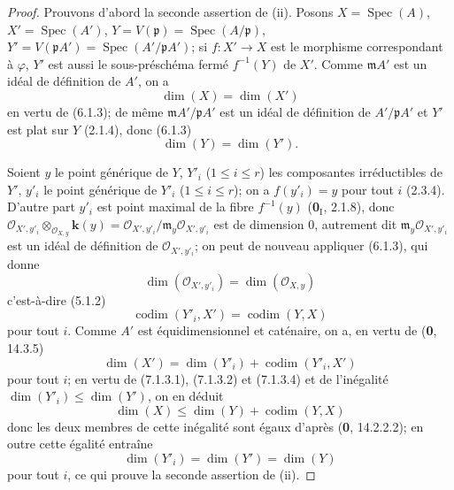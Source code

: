 \begin{proof}
Prouvons d'abord la seconde assertion de (ii). Posons
$X=\operatorname{Spec}(A)$, $X'=\operatorname{Spec}(A')$,
$Y=V(\mathfrak p)=\operatorname{Spec}(A/\mathfrak p)$,
$Y'=V(\mathfrak pA')=\operatorname{Spec}(A'/\mathfrak pA')$; si
$f:X'\to X$ est le morphisme correspondant à $\varphi$, $Y'$ est aussi le
sous-préschéma fermé $f^{-1}(Y)$ de $X'$. Comme $\mathfrak mA'$ est un idéal
de définition de $A'$, on a
\begin{equation}
\dim(X)=\dim(X')
\tag{7.1.3.1}
\label{IV.2.eq.7.1.3.1-fr}
\end{equation}
en vertu de (6.1.3); de même $\mathfrak mA'/\mathfrak pA'$ est un idéal de
définition de $A'/\mathfrak pA'$ et $Y'$ est plat sur $Y$ (2.1.4), donc
(6.1.3)
\begin{equation}
\dim(Y)=\dim(Y').
\tag{7.1.3.2}
\label{IV.2.eq.7.1.3.2-fr}
\end{equation}

Soient $y$ le point générique de $Y$, $Y'_i$ ($1\leqslant i\leqslant r$) les
composantes irréductibles de $Y'$, $y'_i$ le point générique de $Y'_i$
($1\leqslant i\leqslant r$); on a $f(y'_i)=y$ pour tout $i$ (2.3.4).
D'autre part $y'_i$ est point maximal de la fibre $f^{-1}(y)$ (\textbf{0}$_{\mathrm
I}$, 2.1.8), donc
$\mathscr O_{X',y'_i}\otimes_{\mathscr O_{X,y}}\boldsymbol{k}(y)=
\mathscr O_{X',y'_i}/\mathfrak m_y\mathscr O_{X',y'_i}$ est de dimension
0, autrement dit $\mathfrak m_y\mathscr O_{X',y'_i}$ est un idéal de
définition de $\mathscr O_{X',y'_i}$; on peut de nouveau appliquer (6.1.3),
qui donne
\begin{equation}
\dim(\mathscr O_{X',y'_i})=\dim(\mathscr O_{X,y})
\tag{7.1.3.3}
\label{IV.2.eq.7.1.3.3-fr}
\end{equation}
c'est-à-dire (5.1.2)
\begin{equation}
\operatorname{codim}(Y'_i,X')=\operatorname{codim}(Y,X)
\tag{7.1.3.4}
\label{IV.2.eq.7.1.3.4-fr}
\end{equation}
pour tout $i$. Comme $A'$ est équidimensionnel et caténaire, on a, en vertu
de (\textbf{0}, 14.3.5)
\begin{equation}
\dim(X')=\dim(Y'_i)+\operatorname{codim}(Y'_i,X')
\tag{7.1.3.5}
\label{IV.2.eq.7.1.3.5-fr}
\end{equation}
pour tout $i$; en vertu de (7.1.3.1), (7.1.3.2) et (7.1.3.4) et de
l'inégalité $\dim(Y'_i)\leqslant\dim(Y')$, on en déduit
\begin{equation}
\dim(X)\leqslant\dim(Y)+\operatorname{codim}(Y,X)
\tag{7.1.3.6}
\label{IV.2.eq.7.1.3.6-fr}
\end{equation}
donc les deux membres de cette inégalité sont égaux d'après (\textbf{0}, 14.2.2.2);
en outre cette égalité entraîne
\begin{equation}
\dim(Y'_i)=\dim(Y')=\dim(Y)
\tag{7.1.3.7}
\label{IV.2.eq.7.1.3.7-fr}
\end{equation}
pour tout $i$, ce qui prouve la seconde assertion de (ii).


\end{proof}
